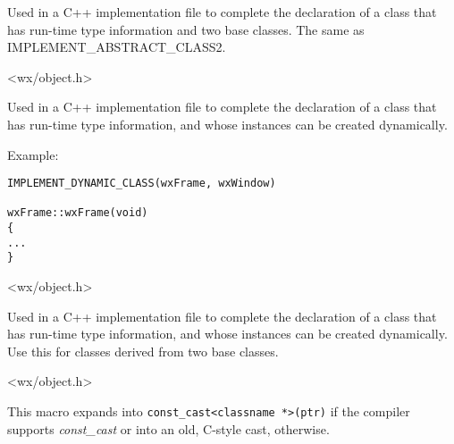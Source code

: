 
Used in a C++ implementation file to complete the declaration of a
class that has run-time type information and two base classes. The
same as IMPLEMENT\_ABSTRACT\_CLASS2.


<wx/object.h>


\label{implementdynamicclass}


Used in a C++ implementation file to complete the declaration of
a class that has run-time type information, and whose instances
can be created dynamically.

Example:

\begin{verbatim}
IMPLEMENT_DYNAMIC_CLASS(wxFrame, wxWindow)

wxFrame::wxFrame(void)
{
...
}
\end{verbatim}


<wx/object.h>


\label{implementdynamicclass2}


Used in a C++ implementation file to complete the declaration of
a class that has run-time type information, and whose instances
can be created dynamically. Use this for classes derived from two
base classes.


<wx/object.h>


\label{wxconstcast}


This macro expands into {\tt const\_cast<classname *>(ptr)} if the compiler
supports {\it const\_cast} or into an old, C-style cast, otherwise.


\\
\\


\label{wxcreatedynamicobject}


